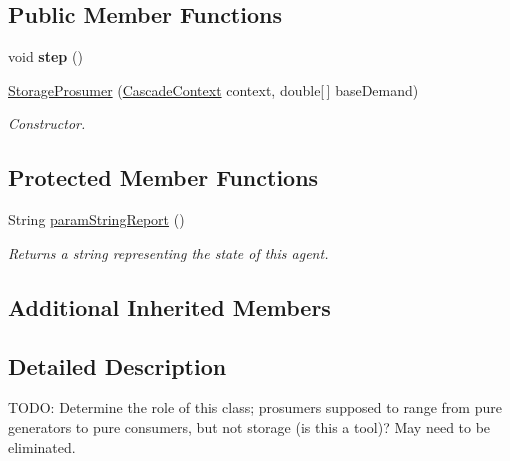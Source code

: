 \subsection*{Public Member Functions}
\begin{DoxyCompactItemize}
\item 
\hypertarget{classuk_1_1ac_1_1dmu_1_1iesd_1_1cascade_1_1agents_1_1prosumers_1_1_storage_prosumer_add2f167d216eb0eb062a45aada33faac}{void {\bfseries step} ()}\label{classuk_1_1ac_1_1dmu_1_1iesd_1_1cascade_1_1agents_1_1prosumers_1_1_storage_prosumer_add2f167d216eb0eb062a45aada33faac}

\item 
\hypertarget{classuk_1_1ac_1_1dmu_1_1iesd_1_1cascade_1_1agents_1_1prosumers_1_1_storage_prosumer_a94303b3469b1bd2ce5ce0a4bb2e6ebbc}{\hyperlink{classuk_1_1ac_1_1dmu_1_1iesd_1_1cascade_1_1agents_1_1prosumers_1_1_storage_prosumer_a94303b3469b1bd2ce5ce0a4bb2e6ebbc}{Storage\-Prosumer} (\hyperlink{classuk_1_1ac_1_1dmu_1_1iesd_1_1cascade_1_1context_1_1_cascade_context}{Cascade\-Context} context, double\mbox{[}$\,$\mbox{]} base\-Demand)}\label{classuk_1_1ac_1_1dmu_1_1iesd_1_1cascade_1_1agents_1_1prosumers_1_1_storage_prosumer_a94303b3469b1bd2ce5ce0a4bb2e6ebbc}

\begin{DoxyCompactList}\small\item\em Constructor. \end{DoxyCompactList}\end{DoxyCompactItemize}
\subsection*{Protected Member Functions}
\begin{DoxyCompactItemize}
\item 
String \hyperlink{classuk_1_1ac_1_1dmu_1_1iesd_1_1cascade_1_1agents_1_1prosumers_1_1_storage_prosumer_aaf808ca9c824b976d64f65fa2d6ea035}{param\-String\-Report} ()
\begin{DoxyCompactList}\small\item\em Returns a string representing the state of this agent. \end{DoxyCompactList}\end{DoxyCompactItemize}
\subsection*{Additional Inherited Members}


\subsection{Detailed Description}
T\-O\-D\-O\-: Determine the role of this class; prosumers supposed to range from pure generators to pure consumers, but not storage (is this a tool)? May need to be eliminated. 

